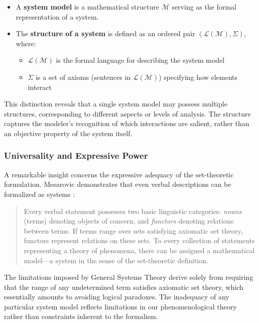 \begin{itemize}
\item A \textbf{system model} is a mathematical structure $\mathcal{M}$ serving as the formal representation of a system.

\item The \textbf{structure of a system} is defined as an ordered pair $(\mathcal{L}(\mathcal{M}), \Sigma)$, where:
\begin{itemize}
\item $\mathcal{L}(\mathcal{M})$ is the formal language for describing the system model
\item $\Sigma$ is a set of axioms (sentences in $\mathcal{L}(\mathcal{M})$) specifying how elements interact
\end{itemize}
\end{itemize}

This distinction reveals that a single system model may possess multiple structures, corresponding to different aspects or levels of analysis. The structure captures the modeler's recognition of which interactions are salient, rather than an objective property of the system itself.

\subsubsection{Universality and Expressive Power}

A remarkable insight concerns the expressive adequacy of the set-theoretic formulation. Mesarovic demonstrates that even verbal descriptions can be formalized as systems \citep{Mesarovic1972}:

\begin{quote}
Every verbal statement possesses two basic linguistic categories: \emph{nouns} (terms) denoting objects of concern, and \emph{functors} denoting relations between terms. If terms range over sets satisfying axiomatic set theory, functors represent relations on these sets. To every collection of statements representing a theory of phenomena, there can be assigned a mathematical model---a system in the sense of the set-theoretic definition.
\end{quote}

The limitations imposed by General Systems Theory derive solely from requiring that the range of any undetermined term satisfies axiomatic set theory, which essentially amounts to avoiding logical paradoxes. The inadequacy of any particular system model reflects limitations in our phenomenological theory rather than constraints inherent to the formalism.

